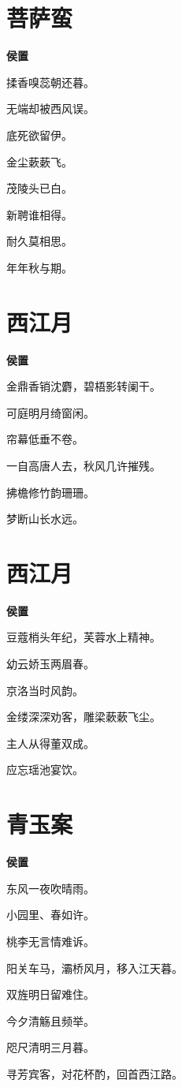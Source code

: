 \documentclass[12pt,a4paper]{ctexbook}
\begin{document}
\section{菩萨蛮}
\textbf{侯置}\par\vspace{0.5em}
揉香嗅蕊朝还暮。\par
无端却被西风误。\par
底死欲留伊。\par
金尘蔌蔌飞。\par
茂陵头已白。\par
新聘谁相得。\par
耐久莫相思。\par
年年秋与期。\par

\section{西江月}
\textbf{侯置}\par\vspace{0.5em}
金鼎香销沈麝，碧梧影转阑干。\par
可庭明月绮窗闲。\par
帘幕低垂不卷。\par
一自高唐人去，秋风几许摧残。\par
拂檐修竹韵珊珊。\par
梦断山长水远。\par

\section{西江月}
\textbf{侯置}\par\vspace{0.5em}
豆蔻梢头年纪，芙蓉水上精神。\par
幼云娇玉两眉春。\par
京洛当时风韵。\par
金缕深深劝客，雕梁蔌蔌飞尘。\par
主人从得董双成。\par
应忘瑶池宴饮。\par

\section{青玉案}
\textbf{侯置}\par\vspace{0.5em}
东风一夜吹晴雨。\par
小园里、春如许。\par
桃李无言情难诉。\par
阳关车马，灞桥风月，移入江天暮。\par
双旌明日留难住。\par
今夕清觞且频举。\par
咫尺清明三月暮。\par
寻芳宾客，对花杯酌，回首西江路。\par
\end{document}
